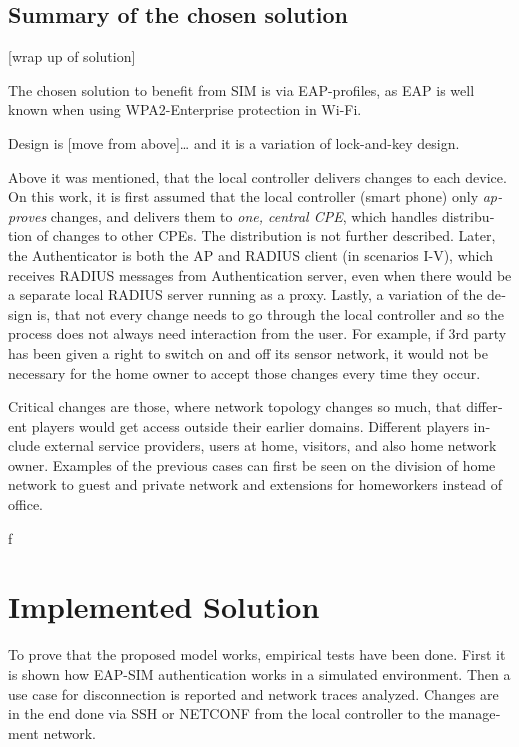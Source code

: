 \documentclass[12pt,a4paper,english]{tutthesis}
\begin{document}
\begin{otherlanguage}{english}
\section{Summary of the chosen solution}
\label{sec-4-9}

[wrap up of solution]

The chosen solution to benefit from SIM is via EAP-profiles, as EAP
is well known when using WPA2-Enterprise protection in Wi-Fi.

Design is [move from above]\ldots{}
and it is a variation of lock-and-key design.

Above it was mentioned, that the local controller delivers changes to each
device. 
On this work, it is first assumed that the local controller (smart
phone) only \emph{approves} changes,
and delivers them to \emph{one, central CPE}, 
which handles distribution of changes to other CPEs. The distribution
is not further described. 
Later, the Authenticator is both the AP and
RADIUS client (in scenarios I-V), which receives RADIUS messages from
Authentication server, even when there would be a separate local RADIUS server
running as a proxy.
Lastly, a variation of the design is, that not every change needs to go
 through  the local controller and so the process does not always need
interaction from the user. For example, if 3rd party has been given 
a right to switch on and off its sensor network, it would not be 
necessary for the home owner to accept those changes every time they occur.



Critical changes are those, where network topology changes so much,
that different players would get access outside their earlier domains.
Different players include external service providers, users at home,
visitors, and also home network owner. Examples of the previous cases can first be
seen on the division of home network to guest and private network and
extensions for homeworkers instead of office.




f

\chapter{Implemented Solution}
\label{sec-5}


To prove that the proposed model works, empirical tests have been done.
First it is shown how EAP-SIM authentication works in a simulated
environment.
 Then a use case for disconnection is reported and network traces analyzed.
Changes are in the end done 
via SSH or NETCONF from the local controller to the management network.




\end{otherlanguage}
\end{document}
